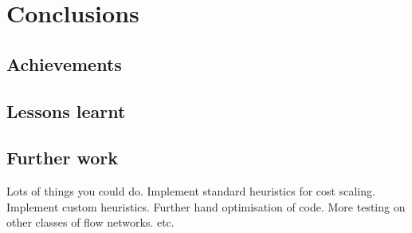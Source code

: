 \chapter{Conclusions}

\section{Achievements}

\section{Lessons learnt}

\section{Further work}

Lots of things you could do. Implement standard heuristics for cost scaling. Implement custom heuristics. Further hand optimisation of code. More testing on other classes of flow networks. etc.